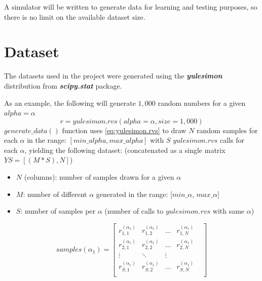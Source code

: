 \documentclass[a4paper, 12pt]{report}
\begin{document}
A simulator will be written to generate data for learning and testing purposes, so there is no limit on the available dataset size.

\section{Dataset}
\label{dataset}

The datasets used in the project were generated using the \textbf{\textit{yulesimon}} distribution from \textbf{\textit{scipy.stat}} package.

As an example, the following will generate $1,000$ random numbers for a given $alpha=\alpha$
\begin{equation}
\label{eq:yulesimon.rvs}
r = yulesimon.rvs(alpha=\alpha, size=1,000)
\end{equation}
$generate\_data()$ function uses \ref{eq:yulesimon.rvs} to draw $N$ random samples for each $\alpha$ in the range: $[min\_alpha, max\_alpha]$ with $S$ $yulesimon.rvs$ calls for each $\alpha$, yielding the following dataset:
(concatenated as a single matrix $YS = [(M * S), N]$)

\begin{itemize}
\small
  \item $N$ (columns): number of samples drawn for a given $\alpha$
  \item $M$: number of different $\alpha$ generated in the range: [$min\_\alpha$, $max\_\alpha$]
  \item $S$: number of samples per $\alpha$ (number of calls to $yulesimon.rvs$ with same $\alpha$)
\end{itemize}
\[
samples(\alpha_1) = \begin{bmatrix} 
    r^{(\alpha_1)}_{1,1} & r^{(\alpha_1)}_{1,2} & \dots & r^{(\alpha_1)}_{1,N} & \\
    r^{(\alpha_1)}_{2,1} & r^{(\alpha_1)}_{2,2} & \dots & r^{(\alpha_1)}_{2,N} & \\
    \vdots & \ddots & \vdots & \\
    r^{(\alpha_1)}_{S,1} & r^{(\alpha_1)}_{S,2} & \dots & r^{(\alpha_1)}_{S,N} & \\
\end{bmatrix}
\]
\end{document}
